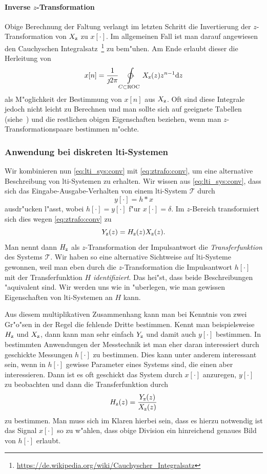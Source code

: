 \paragraph{Inverse \texorpdfstring{$z$}{z}-Transformation}
Obige Berechnung der Faltung verlangt im letzten Schritt die Invertierung der $z$-Transformation von $X_{{\rm z}}$ zu $x[\cdot]$.
Im allgemeinen Fall ist man darauf angewiesen den Cauchyschen Integralsatz~\footnote{\url{https://de.wikipedia.org/wiki/Cauchyscher_Integralsatz}} zu bem"uhen.
Am Ende erlaubt dieser die Herleitung von
\begin{equation}\label{eq:ztrafo:inv}
    x[n] = \frac{1}{\jmath 2 \pi} \ointctrclockwise\limits_{C \subset \mathrm{ROC}} X_{\z}(z) z^{n-1} \mathrm{d}z
\end{equation}
als M"oglichkeit der Bestimmung von $x[n]$ aus $X_{{\rm z}}$.
Oft sind diese Integrale jedoch nicht leicht zu Berechnen und man sollte sich auf geeignete Tabellen (siehe~\cite[Tabelle~3.2,~Tabelle~3.3]{proakis2013}) und die restlichen obigen Eigenschaften beziehen, wenn man $z$-Transformationspaare bestimmen m"ochte.
%
%
\subsubsection{Anwendung bei diskreten \texorpdfstring{\gls{lti}}{LTI}-Systemen}
%
Wir kombinieren nun \eqref{eq:lti_sys:conv} mit \eqref{eq:ztrafo:conv}, um eine alternative Beschreibung von \gls{lti}-Systemen zu erhalten.
Wir wissen aus \eqref{eq:lti_sys:conv}, dass sich das Eingabe-Ausgabe-Verhalten von einem \gls{lti}-System $\mathcal{T}$ durch
\[
y[\cdot] = h \ast x
\]
ausdr"ucken l"asst, wobei $h[\cdot] = y[\cdot]$ f"ur $x[\cdot]=\delta$.
Im $z$-Bereich transformiert sich dies wegen \eqref{eq:ztrafo:conv} zu
\begin{equation}\label{eq:ztrafo:transfer_function}
    Y_{\rm z}(z) = H_{\rm z}(z) X_{\rm z}(z).
\end{equation}
Man nennt dann $H_{{\rm z}}$ als $z$-Transformation der Impulsantwort die \emph{Transferfunktion} des Systems $\mathcal{T}$.
Wir haben so eine alternative Sichtweise auf \gls{lti}-Systeme gewonnen, weil man eben durch die $z$-Transformation die Impulsantwort $h[\cdot]$ mit der Transferfunktion $H$ \emph{identifiziert}.
Das hei"st, dass beide Beschreibungen "aquivalent sind.
Wir werden uns wie in  "uberlegen, wie man gewissen Eigenschaften von \gls{lti}-Systemen an $H$  kann.

Aus diesem multiplikativen Zusammenhang kann man bei Kenntnis von zwei Gr"o"sen in der Regel die fehlende Dritte bestimmen.
Kennt man beispielsweise $H_{\rm z}$ und $X_{\rm z}$, dann kann man sehr einfach $Y_{\rm z}$ und damit auch $y[\cdot]$ bestimmen.
In bestimmten Anwendungen der Messtechnik ist man eher daran interessiert durch geschickte Messungen $h[\cdot]$ zu bestimmen.
Dies kann unter anderem interessant sein, wenn in $h[\cdot]$ gewisse Parameter eines Systems  sind, die einen aber interessieren.
Dann ist es oft geschickt das System durch $x[\cdot]$ anzuregen, $y[\cdot]$ zu beobachten und dann die Transferfunktion durch
\[
H_{\rm z}(z) = \frac{Y_{\rm z}(z)}{X_{\rm z}(z)}
\]
zu bestimmen.
Man muss sich im Klaren hierbei sein, dass es hierzu notwendig ist das Signal $x[\cdot]$ so zu w"ahlen, dass obige Division ein hinreichend genaues Bild von $h[\cdot]$ erlaubt.
%
%
